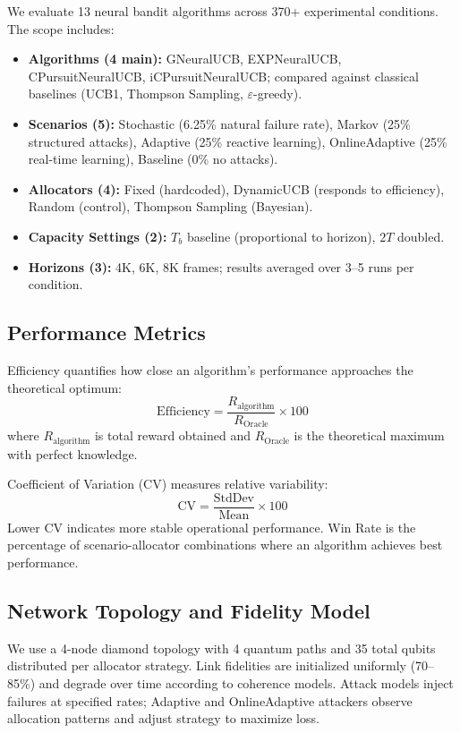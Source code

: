 \documentclass[11pt,a4paper]{article}
\begin{document}
We evaluate 13 neural bandit algorithms across 370+ experimental conditions. The scope includes:

\begin{itemize}
  \item \textbf{Algorithms (4 main):} GNeuralUCB, EXPNeuralUCB, CPursuitNeuralUCB, iCPursuitNeuralUCB; compared against classical baselines (UCB1, Thompson Sampling, $\varepsilon$-greedy).
  \item \textbf{Scenarios (5):} Stochastic (6.25\% natural failure rate), Markov (25\% structured attacks), Adaptive (25\% reactive learning), OnlineAdaptive (25\% real-time learning), Baseline (0\% no attacks).
  \item \textbf{Allocators (4):} Fixed (hardcoded), DynamicUCB (responds to efficiency), Random (control), Thompson Sampling (Bayesian).
  \item \textbf{Capacity Settings (2):} $T_b$ baseline (proportional to horizon), $2T$ doubled.
  \item \textbf{Horizons (3):} 4K, 6K, 8K frames; results averaged over 3--5 runs per condition.
\end{itemize}

\subsection{Performance Metrics}

Efficiency quantifies how close an algorithm's performance approaches the theoretical optimum:
\[
\text{Efficiency} = \frac{R_{\text{algorithm}}}{R_{\text{Oracle}}} \times 100
\]
where $R_{\text{algorithm}}$ is total reward obtained and $R_{\text{Oracle}}$ is the theoretical maximum with perfect knowledge.

Coefficient of Variation (CV) measures relative variability:
\[
\text{CV} = \frac{\text{StdDev}}{\text{Mean}} \times 100
\]
Lower CV indicates more stable operational performance. Win Rate is the percentage of scenario-allocator combinations where an algorithm achieves best performance.

\subsection{Network Topology and Fidelity Model}

We use a 4-node diamond topology with 4 quantum paths and 35 total qubits distributed per allocator strategy. Link fidelities are initialized uniformly (70--85\%) and degrade over time according to coherence models. Attack models inject failures at specified rates; Adaptive and OnlineAdaptive attackers observe allocation patterns and adjust strategy to maximize loss.
\end{document}
